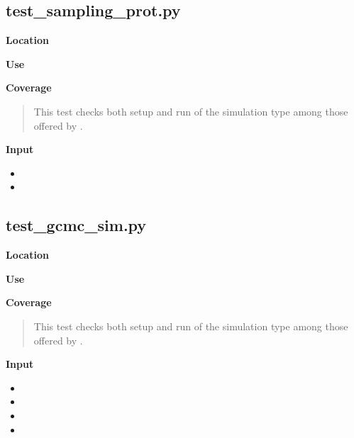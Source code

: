 \documentclass[letterpaper,10pt,english]{manual}
\begin{document}
\subsection{test\_sampling\_prot.py}

\textbf{Location}
\begin{quote}

\end{quote}

\textbf{Use}
\begin{quote}

\end{quote}

\textbf{Coverage}
\begin{quote}

This test checks both setup and run of the  simulation type among those offered by .
\end{quote}

\textbf{Input}
\begin{itemize}
\item {} 

\item {} 

\end{itemize}


\subsection{test\_gcmc\_sim.py}

\textbf{Location}
\begin{quote}

\end{quote}

\textbf{Use}
\begin{quote}

\end{quote}

\textbf{Coverage}
\begin{quote}

This test checks both setup and run of the  simulation type among those offered by .
\end{quote}

\textbf{Input}
\begin{itemize}
\item {} 

\item {} 

\item {} 

\item {} 

\end{itemize}
\end{document}
